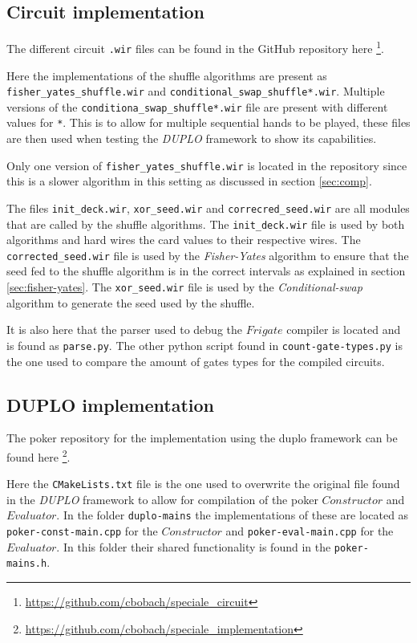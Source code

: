 \documentclass[twoside,11pt,openright]{report}
\newcommand{\FY}{\textit{Fisher-Yates} }
\newcommand{\CS}{\textit{Conditional-swap} }
\newcommand{\DUPLO}{\textit{DUPLO} }
\begin{document}
\begin{appendices}
\subsection{Circuit implementation}
\label{app:circuit-impl}
The different circuit \verb|.wir| files can be found in the GitHub repository here \footnote{\url{https://github.com/cbobach/speciale_circuit}}.

Here the implementations of the shuffle algorithms are present as \verb|fisher_yates_shuffle.wir| and \verb|conditional_swap_shuffle*.wir|. Multiple versions of the \verb|conditiona_swap_shuffle*.wir| file are present with different values for \verb|*|. This is to allow for multiple sequential hands to be played, these files are then used when testing the \DUPLO framework to show its capabilities.

Only one version of \verb|fisher_yates_shuffle.wir| is located in the repository since this is a slower algorithm in this setting as discussed in section \ref{sec:comp}.

The files \verb|init_deck.wir|, \verb|xor_seed.wir| and \verb|correcred_seed.wir| are all modules that are called by the shuffle algorithms. The \verb|init_deck.wir| file is used by both algorithms and hard wires the card values to their respective wires. The \verb|corrected_seed.wir| file is used by the \FY algorithm to ensure that the seed fed to the shuffle algorithm is in the correct intervals as explained in section \ref{sec:fisher-yates}. The \verb|xor_seed.wir| file is used by the \CS algorithm to generate the seed used by the shuffle.

\bigskip

It is also here that the parser used to debug the $Frigate$ compiler is located and is found as \verb|parse.py|. The other python script found in \verb|count-gate-types.py| is the one used to compare the amount of gates types for the compiled circuits.


\subsection{DUPLO implementation}
\label{app:duplo-impl}
The poker repository for the implementation using the duplo framework can be found here \footnote{\url{https://github.com/cbobach/speciale_implementation}}.

Here the \verb|CMakeLists.txt| file is the one used to overwrite the original file found in the \DUPLO framework to allow for compilation of the poker $Constructor$ and $Evaluator$. In the folder \verb|duplo-mains| the implementations of these are located as \verb|poker-const-main.cpp| for the $Constructor$ and \verb|poker-eval-main.cpp| for the $Evaluator$. In this folder their shared functionality is found in the \verb|poker-mains.h|.


\end{appendices}
\end{document}
